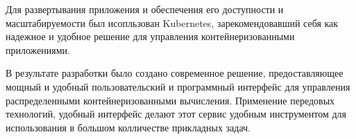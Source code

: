 Для развертывания приложения и обеспечения его доступности и масштабируемости был исопльзован Kubernetes, зарекомендовавший себя как надежное и удобное решение для управления контейнеризованными приложениями.

В результате разработки было создано современное решение, предоставляющее мощный и удобный пользовательский и программный интерфейс для управления распределенными контейнеризованными вычисления. Применение передовых технологий, удобный интерфейс делают этот сервис удобным инструментом для использования в большом колличестве прикладных задач. 
